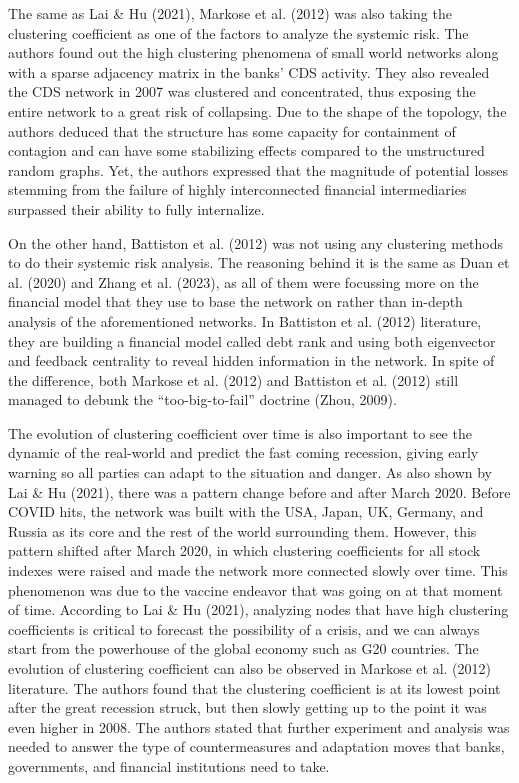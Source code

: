 \documentclass[a4paper,11pt]{article}
\begin{document}
The same as Lai \& Hu (2021), Markose et al. (2012) was also taking the clustering coefficient as one of the factors to analyze the systemic risk. The authors found out the high clustering phenomena of small world networks along with a sparse adjacency matrix in the banks’ CDS activity. They also revealed the CDS network in 2007 was clustered and concentrated, thus exposing the entire network to a great risk of collapsing. Due to the shape of the topology, the authors deduced that the structure has some capacity for containment of contagion and can have some stabilizing effects compared to the unstructured random graphs. Yet, the authors expressed that the magnitude of potential losses stemming from the failure of highly interconnected financial intermediaries surpassed their ability to fully internalize.

On the other hand, Battiston et al. (2012) was not using any clustering methods to do their systemic risk analysis. The reasoning behind it is the same as Duan et al. (2020) and Zhang et al. (2023), as all of them were focussing more on the financial model that they use to base the network on rather than in-depth analysis of the aforementioned networks. In Battiston et al. (2012) literature, they are building a financial model called debt rank and using both eigenvector and feedback centrality to reveal hidden information in the network. In spite of the difference, both Markose et al. (2012) and Battiston et al. (2012) still managed to debunk the “too-big-to-fail” doctrine (Zhou, 2009).

The evolution of clustering coefficient over time is also important to see the dynamic of the real-world and predict the fast coming recession, giving early warning so all parties can adapt to the situation and danger. As also shown by Lai \& Hu (2021), there was a pattern change before and after March 2020. Before COVID hits, the network was built with the USA, Japan, UK, Germany, and Russia as its core and the rest of the world surrounding them. However, this pattern shifted after March 2020, in which clustering coefficients for all stock indexes were raised and made the network more connected slowly over time. This phenomenon was due to the vaccine endeavor that was going on at that moment of time. According to Lai \& Hu (2021), analyzing nodes that have high clustering coefficients is critical to forecast the possibility of a crisis, and we can always start from the powerhouse of the global economy such as G20 countries. The evolution of clustering coefficient can also be observed in Markose et al. (2012) literature. The authors found that the clustering coefficient is at its lowest point after the great recession struck, but then slowly getting up to the point it was even higher in 2008. The authors stated that further experiment and analysis was needed to answer the type of countermeasures and adaptation moves that banks, governments, and financial institutions need to take.
\end{document}

